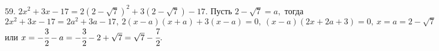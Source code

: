 59. $2x^2+3x-17=2(2-\sqrt{7})^2+3(2-\sqrt{7})-17.$ Пусть $2-\sqrt{7}=a,$ тогда $2x^2+3x-17=2a^2+3a-17,\ 2(x-a)(x+a)+3(x-a)=0,\ (x-a)(2x+2a+3)=0,\ x=a=2-\sqrt{7}$ или $x=-\cfrac{3}{2}-a=-\cfrac{3}{2}-2+\sqrt{7}=\sqrt{7}-\cfrac{7}{2}.$\\
